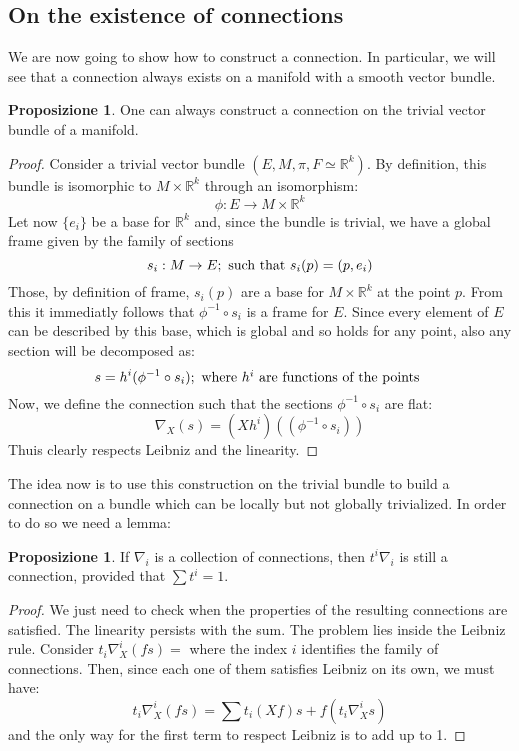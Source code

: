 \documentclass[12pt,a4paper]{report}
\theoremstyle{definition}
\theoremstyle{Theorem}
\newtheorem{Prop}[Def]{Proposizione}
\theoremstyle{definition}
\theoremstyle{definition}
\theoremstyle{definition}
\begin{document}
	\subsection{On the existence of connections}
	We are now going to show how to construct a connection. In particular, we will see that a connection always exists on a manifold with a smooth vector bundle.
	\begin{Prop}
		One can always construct a connection on the trivial vector bundle of a manifold.
	\end{Prop}
	\begin{proof}
		Consider a trivial vector bundle $(E,M,\pi,F\simeq \mathbb{R}^k)$. By definition, this bundle is isomorphic to $M\times \mathbb{R}^k$ through an isomorphism:
		$$\phi:E\rightarrow M\times\mathbb{R}^k$$
		Let now $\{e_i\}$ be a base for $\mathbb{R}^k$ and, since the bundle is trivial, we have a global frame given by the family of sections
		$$s_i:M\rightarrow E;\hbox{ such that } s_i(p)=(p,e_i)$$
		Those, by definition of frame, $s_i(p)$ are a base for $M\times \mathbb{R}^k$ at the point $p$. From this it immediatly follows that $\phi^{-1}\circ s_i$ is a frame for $E$. Since every element of $E$ can be described by this base, which is global and so holds for any point, also any section will be decomposed as:
		$$s=h^i(\phi^{-1}\circ s_i); \hbox{ where $h^i$ are functions of the points }$$
		Now, we define the connection such that the sections $\phi^{-1}\circ s_i$ are flat:
		$$\nabla_X(s)=(Xh^i)((\phi^{-1}\circ s_i))$$
		Thuis clearly respects Leibniz and the linearity.
	\end{proof}
	The idea now is to use this construction on the trivial bundle to build a connection on a bundle which can be locally but not globally trivialized. In order to do so we need a lemma:
	\begin{Prop}
		If $\nabla_i$ is a collection of connections, then $t^i\nabla_i$ is still a connection, provided that $\sum t^i=1$.
	\end{Prop}
	\begin{proof}
		We just need to check when the properties of the resulting connections are satisfied. The linearity persists with the sum. The problem lies inside the Leibniz rule.
		Consider $t_i\nabla^i_X (fs)=$ where the index $i$ identifies the family of connections. Then, since each one of them satisfies Leibniz on its own, we must have:
		$$t_i\nabla^i_X (fs)=\sum t_i(Xf)s+f(t_i\nabla^i_X s)$$ 
		and the only way for the first term to respect Leibniz is to add up to 1.
	\end{proof}
\end{document}
